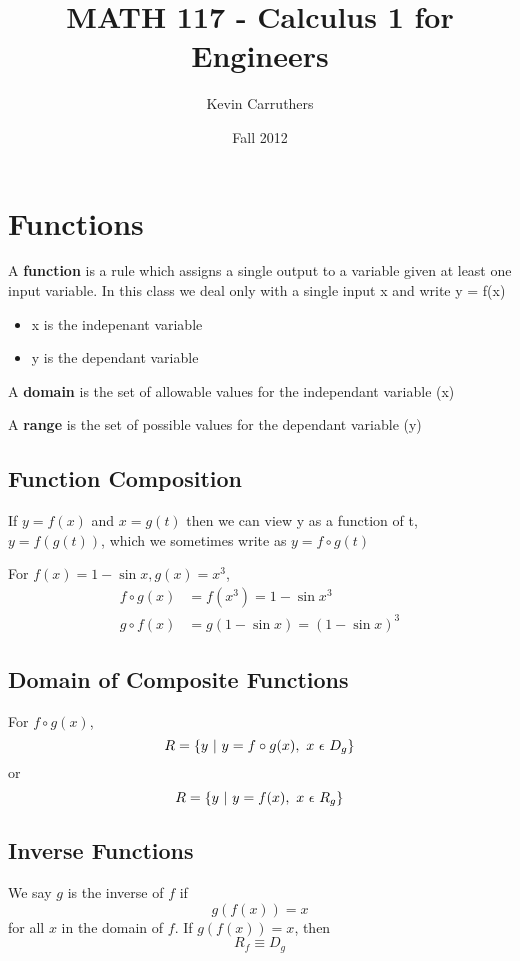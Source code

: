 \documentclass[12pt]{article}
\begin{document}
\title{MATH 117 - Calculus 1 for Engineers}
\author{Kevin Carruthers}
\date{\vspace{-2ex}Fall 2012}
\maketitle\HRule

\section*{Functions}
A {\bf function} is a rule which assigns a single output to a variable given at least one input variable. In this class we deal only with a single input x and write y = f(x)
\begin{itemize}
\item x is the indepenant variable
\item y is the dependant variable
\end{itemize}

A {\bf domain} is the set of allowable values for the independant variable (x)

A {\bf range} is the set of possible values for the dependant variable (y)

\subsection*{Function Composition}
If $y = f(x)$ and $x = g(t)$ then we can view y as a function of t, $y = f(g(t))$, which we sometimes write as $y = f \circ g(t)$

For $f(x) = 1 - \sin{x}, g(x) = x^3$,
\begin{align*}
f \circ g(x) &= f(x^3) = 1 - \sin{x^3}\\
g \circ f(x) &= g(1-\sin{x}) = (1-\sin{x})^3
\end{align*}

\subsection*{Domain of Composite Functions}
For $f\circ g(x)$, \[R = \{y\suchthat y = f\circ g(x),\ x\ \epsilon\ D_g\}\] or \[R = \{y\ |\  y = f(x),\ x\ \epsilon\ R_g\}\]

\subsection*{Inverse Functions}
We say $g$ is the inverse of $f$ if \[ g(f(x)) = x \] for all $x$ in the domain of $f$. If $g(f(x)) = x$, then \[ R_f \equiv D_g \]
\end{document}
